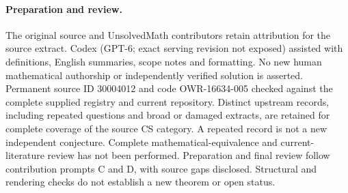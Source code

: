 \documentclass[11pt]{article}
\begin{document}
\paragraph{Preparation and review.}
The original source and UnsolvedMath contributors retain attribution for the source extract. Codex (GPT-6; exact serving revision not exposed) assisted with definitions, English summaries, scope notes and formatting. No new human mathematical authorship or independently verified solution is asserted. Permanent source ID 30004012 and code OWR-16634-005 checked against the complete supplied registry and current repository. Distinct upstream records, including repeated questions and broad or damaged extracts, are retained for complete coverage of the source CS category. A repeated record is not a new independent conjecture. Complete mathematical-equivalence and current-literature review has not been performed. Preparation and final review follow contribution prompts C and D, with source gaps disclosed. Structural and rendering checks do not establish a new theorem or open status.
\label{end:30004012}
\end{document}
